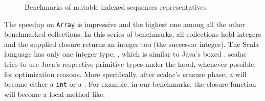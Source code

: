 \begin{figure}
  \centering
  \caption{%
    Benchmarks of mutable indexed sequences representatives
  }
\label{fig:mut_ind_benchs}
\end{figure}


The speedup on \texttt{Array} is impressive and the highest one among all the other
benchmarked collections. In this series of benchmarks, all collections hold
integers and the supplied closure returns an integer too (the successor
integer). The Scala language has only one integer type, , which is similar to Java's
boxed . scalac tries to use Java's respective primitive types
under the hood, whenever possible, for optimization reasons. More specifically,
after scalac's erasure phase, a  will become either a \texttt{int} or a
. For example, in our benchmarks, the closure function will
become a local method like:

